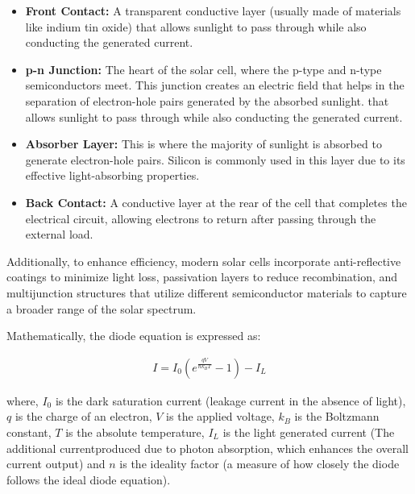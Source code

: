 \begin{itemize}
    \item \textbf{Front Contact:} A transparent conductive layer
    (usually made of materials like indium tin oxide)
    that allows sunlight to pass through while also conducting the generated current.
    \item \textbf{p-n Junction:} The heart of the solar cell, where
    the p-type and n-type semiconductors meet. This
    junction creates an electric field that helps in the
    separation of electron-hole pairs generated by the
    absorbed sunlight.
    that allows sunlight to pass through while also conducting the generated current.
    \item \textbf{Absorber Layer:} This is where the majority of
    sunlight is absorbed to generate electron-hole pairs.
    Silicon is commonly used in this layer due to its
    effective light-absorbing properties.
    \item \textbf{Back Contact:} A conductive layer at the rear of
    the cell that completes the electrical circuit, allowing electrons to return after passing through the
    external load.\\
\end{itemize}

Additionally, to enhance efficiency, modern solar cells
incorporate anti-reflective coatings to minimize light loss,
passivation layers to reduce recombination, and multijunction structures that utilize different semiconductor
materials to capture a broader range of the solar spectrum.

Mathematically, the diode equation is expressed as:

\begin{align}
    I = I_0 \left(e^\frac{qV}{nk_B T} - 1\right) - I_L
\end{align}

where, $I_0$ is the dark saturation current (leakage current
in the absence of light), $q$ is the charge of an electron, $V$ is the applied voltage,
$k_B$ is the Boltzmann constant, $T$ is the absolute temperature, $I_L$ is the light generated current (The additional currentproduced due to photon absorption, which enhances the overall current output) and $n$ is the ideality factor (a measure of how closely the diode follows the ideal diode equation).

